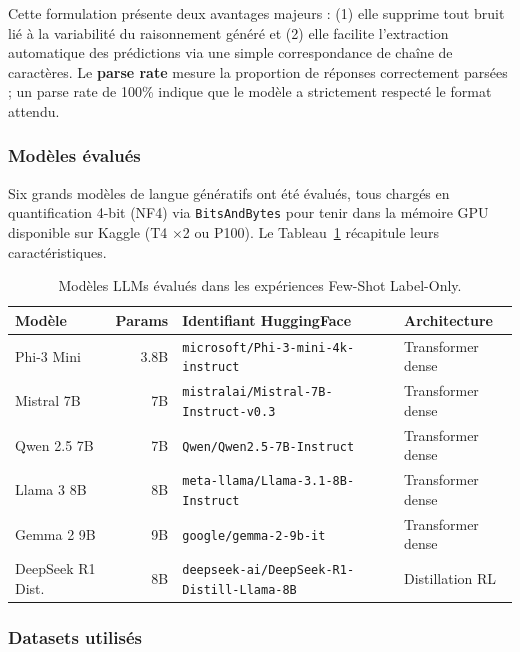 Cette formulation présente deux avantages majeurs : (1) elle supprime tout bruit lié à la variabilité du raisonnement généré et (2) elle facilite l'extraction automatique des prédictions via une simple correspondance de chaîne de caractères. Le \textbf{parse rate} mesure la proportion de réponses correctement parsées ; un parse rate de 100\% indique que le modèle a strictement respecté le format attendu.

\subsubsection{Modèles évalués}

Six grands modèles de langue génératifs ont été évalués, tous chargés en quantification 4-bit (NF4) via \texttt{BitsAndBytes} pour tenir dans la mémoire GPU disponible sur Kaggle (T4 $\times$2 ou P100). Le Tableau~\ref{tab:models} récapitule leurs caractéristiques.

\begin{table}[h]
\centering
\caption{Modèles LLMs évalués dans les expériences Few-Shot Label-Only.}
\label{tab:models}
\begin{tabular}{lrll}
\toprule
\textbf{Modèle} & \textbf{Params} & \textbf{Identifiant HuggingFace} & \textbf{Architecture} \\
\midrule
Phi-3 Mini       & 3.8B  & \texttt{microsoft/Phi-3-mini-4k-instruct}          & Transformer dense \\
Mistral 7B       & 7B    & \texttt{mistralai/Mistral-7B-Instruct-v0.3}        & Transformer dense \\
Qwen 2.5 7B      & 7B    & \texttt{Qwen/Qwen2.5-7B-Instruct}                  & Transformer dense \\
Llama 3 8B       & 8B    & \texttt{meta-llama/Llama-3.1-8B-Instruct}          & Transformer dense \\
Gemma 2 9B       & 9B    & \texttt{google/gemma-2-9b-it}                      & Transformer dense \\
DeepSeek R1 Dist.& 8B    & \texttt{deepseek-ai/DeepSeek-R1-Distill-Llama-8B}  & Distillation RL \\
\bottomrule
\end{tabular}
\end{table}

\subsubsection{Datasets utilisés}

